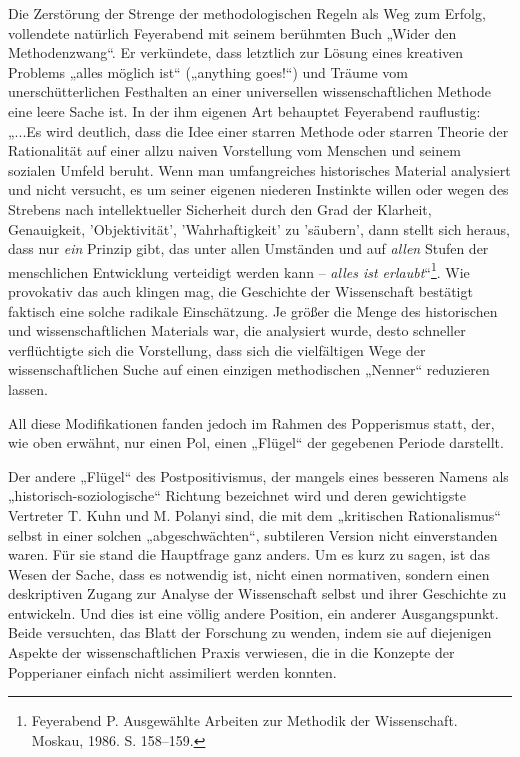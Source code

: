 \documentclass[11pt,a4paper]{article}
\begin{document}
Die Zerstörung der Strenge der methodologischen Regeln als Weg zum Erfolg,
vollendete natürlich Feyerabend mit seinem berühmten Buch „Wider den
Methodenzwang“. Er verkün\-dete, dass letztlich zur Lösung eines kreativen
Problems „alles möglich ist“ („anything goes!“) und Träume vom
unerschütterlichen Festhalten an einer universellen wissenschaftlichen Methode
eine leere Sache ist. In der ihm eigenen Art behauptet Feyerabend
rauf\-lustig: „...Es wird deutlich, dass die Idee einer starren Methode oder
starren Theorie der Rationalität auf einer allzu naiven Vorstellung vom
Menschen und seinem sozialen Umfeld beruht. Wenn man umfangreiches
historisches Material analysiert und nicht versucht, es um seiner eigenen
niederen Instinkte willen oder wegen des Strebens nach intellektueller
Sicherheit durch den Grad der Klarheit, Genauigkeit, 'Objektivität',
'Wahrhaftigkeit' zu 'säubern', dann stellt sich heraus, dass nur \emph{ein}
Prinzip gibt, das unter allen Umständen und auf \emph{allen} Stufen der
menschlichen Entwicklung verteidigt werden kann -- \emph{alles ist
  erlaubt}“\footnote{Feyerabend P. Ausgewählte Arbeiten zur Methodik der
  Wissenschaft. Moskau, 1986.  S. 158–159.}.  Wie provokativ das auch klingen
mag, die Geschichte der Wissenschaft bestätigt faktisch eine solche radikale
Einschätzung. Je größer die Menge des historischen und wissenschaftlichen
Materials war, die analysiert wurde, desto schneller verflüchtigte sich die
Vorstellung, dass sich die vielfältigen Wege der wissenschaftlichen Suche auf
einen einzigen methodischen „Nenner“ reduzieren lassen.

All diese Modifikationen fanden jedoch im Rahmen des Popperismus statt, der,
wie oben erwähnt, nur einen Pol, einen „Flügel“ der gegebenen Periode
darstellt.

Der andere „Flügel“ des Postpositivismus, der mangels eines besseren Namens
als „historisch-soziologische“ Richtung bezeichnet wird und deren gewichtigste
Vertreter T. Kuhn und M. Polanyi sind, die mit dem „kritischen Rationalismus“
selbst in einer solchen „abgeschwächten“, subtileren Version nicht
einverstanden waren. Für sie stand die Hauptfrage ganz anders.  Um es kurz zu
sagen, ist das Wesen der Sache, dass es notwendig ist, nicht einen normativen,
sondern einen deskriptiven Zugang zur Analyse der Wissenschaft selbst und
ihrer Geschichte zu entwickeln. Und dies ist eine völlig andere Position, ein
anderer Ausgangspunkt. Beide versuchten, das Blatt der Forschung zu wenden,
indem sie auf diejenigen Aspekte der wissenschaftlichen Praxis verwiesen, die
in die Konzepte der Popperianer einfach nicht assimiliert werden konnten.
\end{document}
